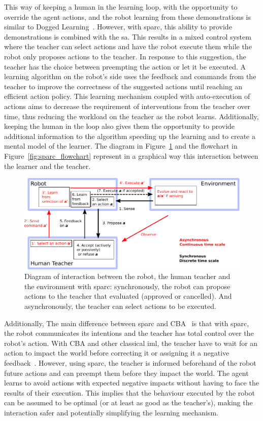 This way of keeping a human in the learning loop, with the opportunity to override the agent actions, and the robot learning from these demonstrations is similar to Dogged Learning~\citep{grollman2007dogged}. However, with \gls{sparc}, this ability to provide demonstrations is combined with the \gls{sa}. This results in a mixed control system where the teacher can select actions and have the robot execute them while the robot only proposes actions to the teacher. In response to this suggestion, the teacher has the choice between preempting the action or let it be executed. A learning algorithm on the robot's side uses the feedback and commands from the teacher to improve the correctness of the suggested actions until reaching an efficient action policy. This learning mechanism coupled with auto-execution of actions aims to decrease the requirement of interventions from the teacher over time, thus reducing the workload on the teacher as the robot learns. Additionally, keeping the human in the loop also gives them the opportunity to provide additional information to the algorithm speeding up the learning and to create a mental model of the learner. The diagram in Figure~\ref{fig:sparc_diagram} and the flowchart in Figure~\ref{fig:sparc_flowchart} represent in a graphical way this interaction between the learner and the teacher.

\begin{figure}[ht]
	\includegraphics[width=1\linewidth]{diagram.pdf}
	\centering
	\caption{Diagram of interaction between the robot, the human teacher and the environment with \gls{sparc}: synchronously, the robot can propose actions to the teacher that evaluated (approved or cancelled). And asynchronously, the teacher can select actions to be executed.}
	\label{fig:sparc_diagram}
\end{figure}

Additionally, The main difference between \gls{sparc} and CBA~\citep{chernova2009interactive} is that with \gls{sparc}, the robot communicates its intentions and the teacher has total control over the robot's action. With CBA and other classical \gls{iml}, the teacher have to wait for an action to impact the world before correcting it or assigning it a negative feedback~\citep{thomaz2008teachable,knox2009interactively}. However, using \gls{sparc}, the teacher is informed beforehand of the robot future actions and can preempt them before they impact the world. The agent learns to avoid actions with expected negative impacts without having to face the results of their execution. This implies that the behaviour executed by the robot can be assumed to be optimal (or at least as good as the teacher's), making the interaction safer and potentially simplifying the learning mechanism.


